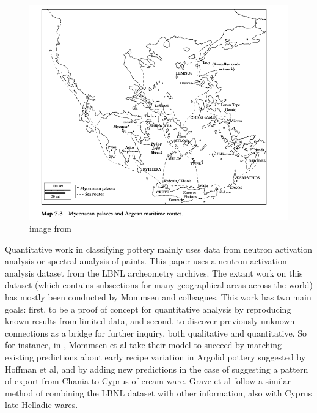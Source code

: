 \documentclass[10pt,a4paper]{article}
\begin{document}
\begin{figure}
\includegraphics[width=\textwidth]{pottery2.png}
\caption{image from \cite{demand2011mediterranean}}
\label{fig:seamap}
\end{figure}

Quantitative work in classifying pottery mainly uses data from neutron activation analysis or spectral analysis of paints.  This paper uses a neutron activation analysis dataset from the LBNL archeometry archives. The extant work on this dataset (which contains subsections for many geographical areas across the world) has mostly been conducted by Mommsen and colleagues. This work has two main goals: first, to be a proof of concept for quantitative analysis by reproducing known results from limited data, and second, to discover previously unknown connections as a bridge for further inquiry, both qualitative and quantitative.  So for instance, in \cite{mommsen2002complete}, Mommsen et al take their model to succeed by matching existing predictions about early recipe variation in Argolid pottery suggested by Hoffman et al, and by adding new predictions in the case of suggesting a pattern of export from Chania to Cyprus of cream ware.  Grave  et al\cite{grave2014ceramics} follow a similar method of combining the LBNL dataset with other information, also with Cyprus late Helladic wares. 
\end{document}
